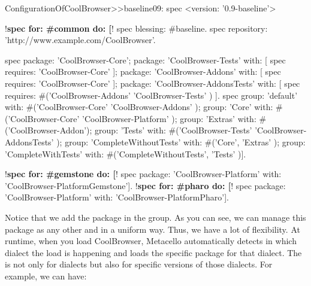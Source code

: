 \documentclass[a4paper,10pt,twoside]{book}
\begin{document}
\begin{code}{}
ConfigurationOfCoolBrowser>>baseline09: spec 
      <version: '0.9-baseline'>
      
      !\textbf{spec for: \#common do: [}!
            spec blessing: #baseline.
            spec repository: 'http://www.example.com/CoolBrowser'.
            
            spec 
                  package: 'CoolBrowser-Core';
                  package: 'CoolBrowser-Tests' with: [ spec requires: 'CoolBrowser-Core' ];
                  package: 'CoolBrowser-Addons' with: [ spec requires: 'CoolBrowser-Core' ];
                  package: 'CoolBrowser-AddonsTests' with: [ 
                        spec requires: #('CoolBrowser-Addons' 'CoolBrowser-Tests' ) ].
            spec 
                  group: 'default' with: #('CoolBrowser-Core' 'CoolBrowser-Addons' );
                  group: 'Core' with: #('CoolBrowser-Core' 'CoolBrowser-Platform' );
                  group: 'Extras' with: #('CoolBrowser-Addon');
                  group: 'Tests' with: #('CoolBrowser-Tests' 'CoolBrowser-AddonsTests' );
                  group: 'CompleteWithoutTests' with: #('Core', 'Extras' );
                  group: 'CompleteWithTests' with: #('CompleteWithoutTests', 'Tests' )].
                  
      !\textbf{spec for: \#gemstone do: [}!
            spec package: 'CoolBrowser-Platform' with: 'CoolBrowser-PlatformGemstone'].
      !\textbf{spec for: \#pharo do: [}!
            spec package: 'CoolBrowser-Platform' with: 'CoolBrowser-PlatformPharo'].
\end{code}

Notice that we add the package  in the  group. As you can see, we can manage this package as any other and in a uniform way. Thus, we have a lot of flexibility. At runtime, when you load CoolBrowser, Metacello automatically detects in which dialect the load is happening and loads the specific package for that dialect. The  is not only for dialects but also for specific versions of those dialects. For example, we can have:
\end{document}
